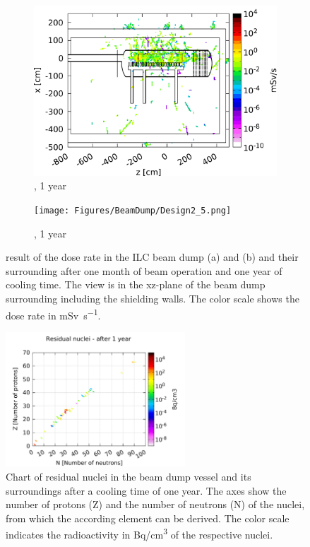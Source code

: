 \begin{figure}[h]
 \centering
    \begin{subfigure}[b]{0.49\textwidth}
   \centering
    \includegraphics[width=\textwidth]{Figures/BeamDump/Design1_5.png}
   \caption{\designone, 1 year}
   \end{subfigure} 
   \hfill
    \begin{subfigure}[b]{0.49\textwidth}
   \centering
    \texttt{[image: Figures/BeamDump/Design2\_5.png]}
   \caption{\designtwo, 1 year}
   \end{subfigure}
   \caption[Dose rate in the ILC main beam dump after one year]{\fluka result of the dose rate in the ILC beam dump \designone (a) and \designtwo (b) and their surrounding after one month of beam operation and one year of cooling time.
   The view is in the xz-plane of the beam dump surrounding including the shielding walls.
   The color scale shows the dose rate in \si{\milli\sievert\per\second}.}
   \label{fig:BeamDumps:DoseRate_1year}
\end{figure}


\begin{figure}[!hbp]
\centering
\includegraphics[width=0.6\textwidth]{Figures/BeamDump/Corrected_residualnuclei_plots/ResidualNuclei_Design2_5_correct_scale.pdf}
\caption[Residual nuclei in the ILC main beam dump after one year]{Chart of residual nuclei in the beam dump vessel and its surroundings after a cooling time of one year.
The axes show the number of protons (Z) and the number of neutrons (N) of the nuclei, from which the according element can be derived.
The color scale indicates the radioactivity in \si[detect-all]{\becquerel}/\si{\centi\meter\cubed} of the respective nuclei.}
\label{fig:BeamDumps:ResidualNuclei}
\end{figure}
 
